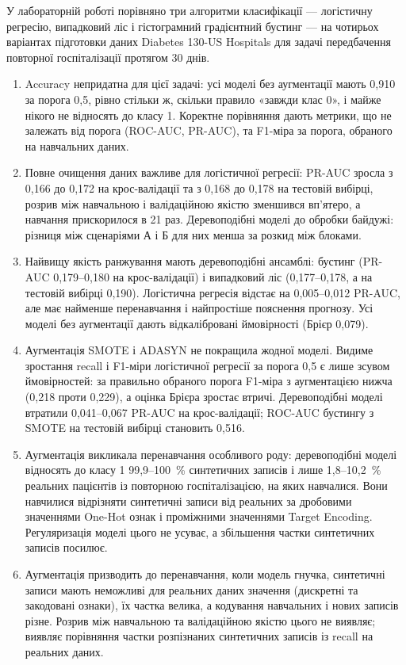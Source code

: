 \documentclass[14pt,a4paper]{extreport}
\begin{document}
У лабораторній роботі порівняно три алгоритми класифікації --- логістичну регресію, випадковий ліс і гістограмний градієнтний бустинг --- на чотирьох варіантах підготовки даних Diabetes 130-US Hospitals для задачі передбачення повторної госпіталізації протягом 30 днів.

\begin{enumerate}
\item Accuracy непридатна для цієї задачі: усі моделі без аугментації мають 0,910 за порога 0,5, рівно стільки ж, скільки правило «завжди клас 0», і майже нікого не відносять до класу 1. Коректне порівняння дають метрики, що не залежать від порога (ROC-AUC, PR-AUC), та F1-міра за порога, обраного на навчальних даних.

\item Повне очищення даних важливе для логістичної регресії: PR-AUC зросла з 0,166 до 0,172 на крос-валідації та з 0,168 до 0,178 на тестовій вибірці, розрив між навчальною і валідаційною якістю зменшився вп'ятеро, а навчання прискорилося в 21 раз. Деревоподібні моделі до обробки байдужі: різниця між сценаріями А і Б для них менша за розкид між блоками.

\item Найвищу якість ранжування мають деревоподібні ансамблі: бустинг (PR-AUC 0,179--0,180 на крос-валідації) і випадковий ліс (0,177--0,178, а на тестовій вибірці 0,190). Логістична регресія відстає на 0,005--0,012 PR-AUC, але має найменше перенавчання і найпростіше пояснення прогнозу. Усі моделі без аугментації дають відкалібровані ймовірності (Брієр 0,079).

\item Аугментація SMOTE і ADASYN не покращила жодної моделі. Видиме зростання recall і F1-міри логістичної регресії за порога 0,5 є лише зсувом ймовірностей: за правильно обраного порога F1-міра з аугментацією нижча (0,218 проти 0,229), а оцінка Брієра зростає втричі. Деревоподібні моделі втратили 0,041--0,067 PR-AUC на крос-валідації; ROC-AUC бустингу з SMOTE на тестовій вибірці становить 0,516.

\item Аугментація викликала перенавчання особливого роду: деревоподібні моделі відносять до класу 1 99,9--100~\% синтетичних записів і лише 1,8--10,2~\% реальних пацієнтів із повторною госпіталізацією, на яких навчалися. Вони навчилися відрізняти синтетичні записи від реальних за дробовими значеннями One-Hot ознак і проміжними значеннями Target Encoding. Регуляризація моделі цього не усуває, а збільшення частки синтетичних записів посилює.

\item Аугментація призводить до перенавчання, коли модель гнучка, синтетичні записи мають неможливі для реальних даних значення (дискретні та закодовані ознаки), їх частка велика, а кодування навчальних і нових записів різне. Розрив між навчальною та валідаційною якістю цього не виявляє; виявляє порівняння частки розпізнаних синтетичних записів із recall на реальних даних.
\end{enumerate}
\end{document}
